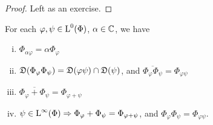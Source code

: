 \begin{proof}
  Left as an exercise.
% 

\end{proof}

\begin{lem} 
\label{maintheorem4}
  
 For each $\varphi, \psi \in {\text{L}^0}(\Phi)$, $\alpha \in \mathbb{C}$, we have

\begin{enumerate}[(i)]
  \item $\Phi_{\alpha \varphi} = \alpha \Phi_\varphi$
  \item $\mathfrak{D}(\Phi_\varphi \Phi_\psi) = \mathfrak{D}(\varphi \psi) \cap \mathfrak{D}(\psi)$, and 
  $\overline{\Phi_\varphi \Phi_\psi} = \Phi_{\varphi \psi}$
  \item $ \overline{\Phi_\varphi + \Phi_\psi} = \Phi_{\varphi + \psi}$
  \item $\psi \in {\text{L}^\infty }(\Phi) \Rightarrow \Phi_\varphi + \Phi_\psi =
  \Phi_{\varphi+\psi}$, and $\Phi_\varphi \Phi_\psi = \Phi_{\varphi \psi}$.
\end{enumerate}

  
\end{lem}


